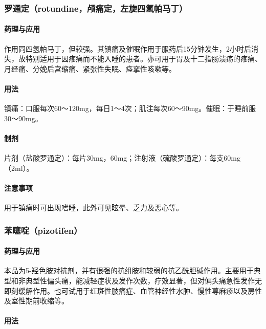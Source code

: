 \subsubsection{罗通定（rotundine，颅痛定，左旋四氢帕马丁）}

\paragraph{药理与应用}

作用同四氢帕马丁，但较强。其镇痛及催眠作用于服药后15分钟发生，2小时后消失，故特别适用于因疼痛而不能入睡的患者。亦可用于胃及十二指肠溃疡的疼痛、月经痛、分娩后宫缩痛、紧张性失眠、痉挛性咳嗽等。

\paragraph{用法}

镇痛：口服每次60～120mg，每日1～4次；肌注每次60～90mg。催眠：于睡前服30～90mg。

\paragraph{制剂}

片剂（盐酸罗通定）：每片30mg，60mg；注射液（硫酸罗通定）：每支60mg（2ml）。

\paragraph{注意事项}

用于镇痛时可出现嗜睡，此外可见眩晕、乏力及恶心等。

\subsubsection{苯噻啶（pizotifen）}

\paragraph{药理与应用}

本品为5-羟色胺对抗剂，并有很强的抗组胺和较弱的抗乙酰胆碱作用。主要用于典型和非典型性偏头痛，能减轻症状及发作次数，疗效显著，但对偏头痛急性发作无即刻缓解作用。也可试用于红斑性肢痛症、血管神经性水肿、慢性荨麻疹以及房性及室性期前收缩等。

\paragraph{用法}

